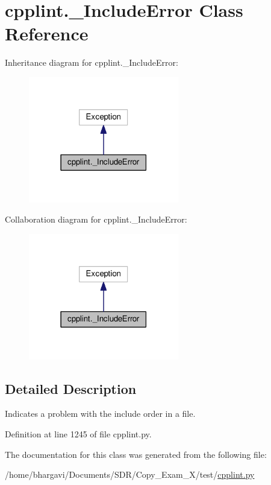 \hypertarget{classcpplint_1_1___include_error}{}\section{cpplint.\+\_\+\+Include\+Error Class Reference}
\label{classcpplint_1_1___include_error}


Inheritance diagram for cpplint.\+\_\+\+Include\+Error\+:
\nopagebreak
\begin{figure}[H]
\begin{center}
\leavevmode
\includegraphics[width=186pt]{classcpplint_1_1___include_error__inherit__graph}
\end{center}
\end{figure}


Collaboration diagram for cpplint.\+\_\+\+Include\+Error\+:
\nopagebreak
\begin{figure}[H]
\begin{center}
\leavevmode
\includegraphics[width=186pt]{classcpplint_1_1___include_error__coll__graph}
\end{center}
\end{figure}


\subsection{Detailed Description}
\begin{DoxyVerb}Indicates a problem with the include order in a file.\end{DoxyVerb}
 

Definition at line 1245 of file cpplint.\+py.



The documentation for this class was generated from the following file\+:\begin{DoxyCompactItemize}
\item 
/home/bhargavi/\+Documents/\+S\+D\+R/\+Copy\+\_\+\+Exam\+\_\+X/test/\hyperlink{cpplint_8py}{cpplint.\+py}\end{DoxyCompactItemize}
